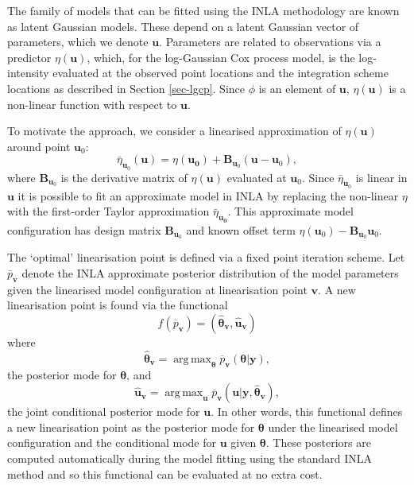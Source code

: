 \documentclass{statsoc}
\newcommand{\ol}[1]{\overline{#1}}
\newcommand{\wh}[1]{\widehat{#1}}
\newcommand{\bm}{\boldsymbol}  %
\DeclareMathOperator*{\argmax}{arg\,max}  %
\begin{document}
The family of models that can be fitted using the INLA methodology are known as latent Gaussian models.  These depend on a latent Gaussian vector of parameters, which we denote $\bm{u}$. Parameters are related to observations via a predictor $\eta(\bm{u})$, which, for the log-Gaussian Cox process model, is the log-intensity evaluated at the observed point locations and the integration scheme locations as described in Section \ref{sec-lgcp}.  Since $\phi$ is an element of $\bm{u}$, $\eta(\bm{u})$ is a non-linear function with respect to $\bm{u}$.

To motivate the approach, we consider a linearised approximation of $\eta(\bm{u})$ around point $\bm{u}_0$:
\begin{equation*}
\bar{\eta}_{\bm{u}_0} (\bm{u}) = \eta(\bm{u_0}) + \bm{B}_{\bm{u}_0}(\bm{u} - \bm{u}_0),
\end{equation*}
where $\bm{B}_{\bm{u}_0}$ is the derivative matrix of $\eta(\bm{u})$ evaluated at $\bm{u}_0$.  Since $\bar{\eta}_{\bm{u}_0}$ is linear in $\bm{u}$ it is possible to fit an approximate model in INLA by replacing the non-linear $\eta$ with the first-order Taylor approximation $\bar{\eta}_{\bm{u_0}}$.  This approximate model configuration has design matrix $\bm{B}_{\bm{u}_0}$ and known offset term $\eta(\bm{u}_0) - \bm{B}_{\bm{u}_0}\bm{u}_0$.

The `optimal' linearisation point is defined via a fixed point iteration scheme. Let $\bar{p}_{\bm{v}}$ denote the INLA approximate posterior distribution of the model parameters given the linearised model configuration at linearisation point $\bm{v}$.  A new linearisation point is found via the functional
\begin{equation}
	f(\ol{p}_{\bm{v}}) = (\wh{\bm{\theta}}_{\bm{v}},\wh{\bm{u}}_{\bm{v}})
\end{equation}
where
\begin{equation}
\wh{\bm{\theta}}_{\bm{v}} = \argmax_{\bm{\theta}} \ol{p}_{\bm{v}} ( \bm{\theta} | \bm{y}),
\end{equation}
the posterior mode for $\bm{\theta}$, and
\begin{equation}
\wh{\bm{u}}_{\bm{v}} = \argmax_{\bm{u}} \ol{p}_{\bm{v}} (\bm{u} | \bm{y}, \wh{\bm{\theta}}_{\bm{v}}),
\end{equation}
the joint conditional posterior mode for $\bm{u}$.  In other words, this functional defines a new linearisation point as the posterior mode for $\bm{\theta}$ under the linearised model configuration and the conditional mode for $\bm{u}$ given $\bm{\theta}$.  These posteriors are computed automatically during the model fitting using the standard INLA method and so this functional can be evaluated at no extra cost.
\end{document}
